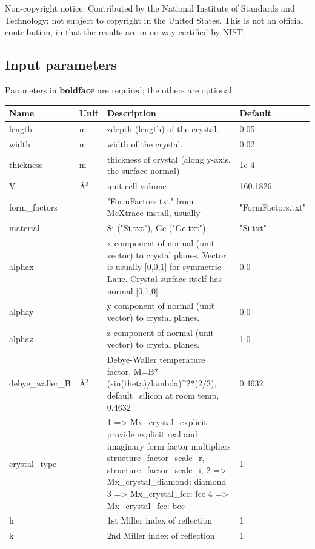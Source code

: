 Non-copyright notice: Contributed by the National Institute of Standards and Technology; not subject to copyright in the United States. This is not an official contribution, in that the results are in no way certified by NIST.

\subsection*{Input parameters}
Parameters in \textbf{boldface} are required; the others are optional.

\begin{longtable}{p{}p{}p{}p{}}
\toprule
\textbf{Name} & \textbf{Unit} & \textbf{Description} & \textbf{Default} \\
\midrule
\endhead
length & m & zdepth (length) of the crystal. & 0.05 \\
width & m & width of the crystal. & 0.02 \\
thickness & m & thickness of crystal (along y-axis, the surface normal) & 1e-4 \\
V & \AA{}$^{3}$ & unit cell volume & 160.1826 \\
form\_factors &   & "FormFactors.txt" from McXtrace install, usually & "FormFactors.txt" \\
material &   & Si ("Si.txt"), Ge ("Ge.txt") & "Si.txt" \\
alphax &   & x component of normal (unit vector) to crystal planes. Vector is usually [0,0,1] for symmetric Laue. Crystal surface itself has normal [0,1,0]. & 0.0 \\
alphay &   & y component of normal (unit vector) to crystal planes. & 0.0 \\
alphaz &   & z component of normal (unit vector) to crystal planes. & 1.0 \\
debye\_waller\_B & \AA{}$^{2}$ & Debye-Waller temperature factor, M=B*(sin(theta)/lambda)\textasciicircum{}2*(2/3), default=silicon at room temp, 0.4632 & 0.4632 \\
crystal\_type &   & 1 =\textgreater{} Mx\_crystal\_explicit: provide explicit real and imaginary form factor multipliers structure\_factor\_scale\_r, structure\_factor\_scale\_i, 2 =\textgreater{} Mx\_crystal\_diamond: diamond 3 =\textgreater{} Mx\_crystal\_fcc: fcc 4 =\textgreater{} Mx\_crystal\_fcc: bcc & 1 \\
h &   & 1st Miller index of reflection & 1 \\
k &   & 2nd Miller index of reflection & 1 \\

\end{longtable}
